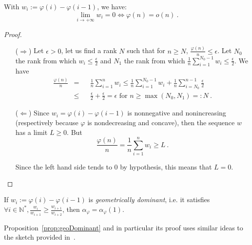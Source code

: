 \begin{proposition}
  With $w_i := \varphi(i)-\varphi(i-1)$, we have:
  \[ \lim_{i \rightarrow +\infty} w_i = 0 \iff \varphi(n) = o(n)\ .\]
  \label{prop:thieleEqLim}
\end{proposition}
\begin{proof}
  \begin{itemize}
  \item[($\Rightarrow$)] Let $\epsilon > 0$, let us find a rank $N$ such that for $n \geq N$, $\frac{\varphi(n)}{n} \leq \epsilon$. Let $N_0$ the rank from which $w_i \leq \frac{\epsilon}{2}$ and $N_1$ the rank from which $\frac{1}{n} \sum_{i=1}^{N_0-1} w_i \leq \frac{\epsilon}{2}$. We have   
    \begin{equation}
      \begin{aligned}
        \frac{\varphi(n)}{n} &=&& \frac{1}{n} \sum_{i=1}^{n} w_i \leq \frac{1}{n} \sum_{i=1}^{N_0-1} w_i + \frac{1}{n} \sum_{i=N_0}^{n-1} \frac{\epsilon}{2}\\
        &\leq&& \frac{\epsilon}{2} + \frac{\epsilon}{2} = \epsilon \text{ for } n \geq \max(N_0,N_1) =: N\ .
      \end{aligned}
    \end{equation}
  \item[($\Leftarrow$)] Since $w_i = \varphi(i)-\varphi(i-1)$ is nonnegative and nonincreasing (respectively because $\varphi$ is nondecreasing and concave), then the sequence $w$ has a limit $L \geq 0$. But
    \[ \frac{\varphi(n)}{n} = \frac{1}{n} \sum_{i=1}^{n} w_i \geq L \ . \]
    
    Since the left hand side tends to $0$ by hypothesis, this means that $L=0$.
  \end{itemize}
\end{proof}

\begin{proposition}
    If $w_i := \varphi(i) - \varphi(i-1)$ is \emph{geometrically dominant}, i.e. it satisfies $\forall i \in \mathbb{N}^*, \frac{w_i}{w_{i+1}} \geq \frac{w_{i+1}}{w_{i+2}}$, then $\alpha_{\varphi} = \alpha_{\varphi}(1)$.
  \label{prop:geoDominant}
\end{proposition}

\begin{rk}
  Proposition~\ref{prop:geoDominant} and in particular its proof uses similar ideas to the sketch provided in~\cite{DMMS20}.
\end{rk}

